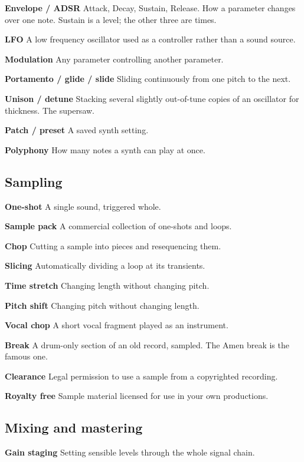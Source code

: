 \textbf{Envelope / ADSR} Attack, Decay, Sustain, Release. How a parameter changes over one note.
Sustain is a level; the other three are times.

\textbf{LFO} A low frequency oscillator used as a controller rather than a sound source.

\textbf{Modulation} Any parameter controlling another parameter.

\textbf{Portamento / glide / slide} Sliding continuously from one pitch to the next.

\textbf{Unison / detune} Stacking several slightly out-of-tune copies of an oscillator for
thickness. The supersaw.

\textbf{Patch / preset} A saved synth setting.

\textbf{Polyphony} How many notes a synth can play at once.

\subsection{Sampling}\label{th09_glossary-sampling}

\textbf{One-shot} A single sound, triggered whole.

\textbf{Sample pack} A commercial collection of one-shots and loops.

\textbf{Chop} Cutting a sample into pieces and resequencing them.

\textbf{Slicing} Automatically dividing a loop at its transients.

\textbf{Time stretch} Changing length without changing pitch.

\textbf{Pitch shift} Changing pitch without changing length.

\textbf{Vocal chop} A short vocal fragment played as an instrument.

\textbf{Break} A drum-only section of an old record, sampled. The Amen break is the famous one.

\textbf{Clearance} Legal permission to use a sample from a copyrighted recording.

\textbf{Royalty free} Sample material licensed for use in your own productions.

\subsection{Mixing and mastering}\label{th09_glossary-mixing-and-mastering}

\textbf{Gain staging} Setting sensible levels through the whole signal chain.

